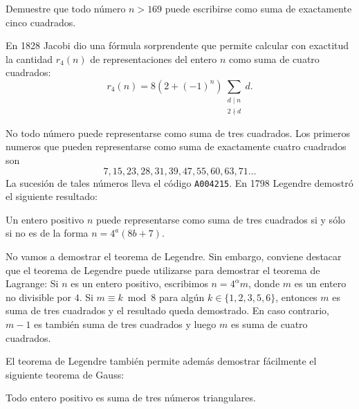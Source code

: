 \begin{exercise}
	Demuestre que todo número $n>169$ puede escribirse como suma de exactamente
	cinco cuadrados.
\end{exercise}

En 1828 Jacobi dio una fórmula sorprendente que permite calcular con exactitud
la cantidad $r_{4}(n)$ de representaciones del entero $n$ como suma de cuatro
cuadrados:
\[
	r_{4}(n)=8(2+(-1)^n)\sum_{\substack{d\mid n\\2\nmid d}}d.
\]

No todo número puede representarse como suma de tres cuadrados.  Los primeros
numeros que pueden representarse como suma de exactamente cuatro cuadrados son 
\[
	7, 15, 23, 28, 31, 39, 47, 55, 60, 63, 71\dots
\]
La sucesión de tales números lleva el código \verb+A004215+.  En 1798 Legendre
demostró el siguiente resultado:

\begin{theorem}[Legendre]
Un entero positivo $n$ puede representarse como suma de tres
cuadrados si y sólo si no es de la forma $n=4^a(8b+7)$. 
\end{theorem}

No vamos a demostrar el teorema de Legendre. Sin embargo, conviene destacar 
que el teorema de Legendre puede utilizarse para 
demostrar el teorema de Lagrange: Si $n$ es un
entero positivo, escribimos $n=4^{\alpha}m$, donde $m$ es un entero no
divisible por $4$. Si $m\equiv k\bmod 8$ para algún $k\in\{1,2,3,5,6\}$,
entonces $m$ es suma de tres cuadrados y el resultado queda demostrado. En caso
contrario, $m-1$ es también suma de tres cuadrados y luego $m$ es suma de
cuatro cuadrados. 




El teorema de Legendre también permite además demostrar fácilmente el siguiente
teorema de Gauss:

\begin{theorem}[Gauss]
	Todo entero positivo es suma de tres números triangulares.
\end{theorem}

